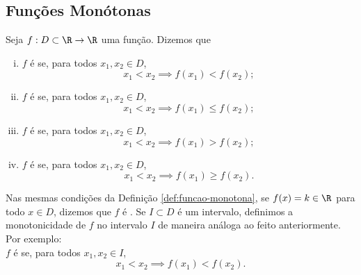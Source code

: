\subsection{Funções Monótonas}

\begin{definition}
\label{def:funcao-monotona}
    Seja $f: D \subset \R \to \R$ uma função. Dizemos que
\begin{enumerate}[(i)]
  \item $f$ é  se, para todos $x_1, x_2 \in D$,
  $$x_1 < x_2 \implies f(x_1) < f(x_2);$$
  \item $f$ é  se, para todos $x_1, x_2 \in D$,
  $$x_1 < x_2 \implies f(x_1) \leq f(x_2);$$
  \item $f$ é  se, para todos $x_1, x_2 \in D$,
  $$x_1 < x_2 \implies f(x_1) > f(x_2);$$
  \item $f$ é  se, para todos $x_1, x_2 \in D$,
  $$x_1 < x_2 \implies f(x_1) \geq f(x_2).$$
\end{enumerate}
\end{definition}

Nas mesmas condições da Definição \ref{def:funcao-monotona}, se $f(x) = k \in
\R$ para todo $x \in D$, dizemos que $f$ é .
Se $I \subset D$ é um intervalo, definimos a monotonicidade de $f$
no intervalo $I$ de maneira análoga ao feito anteriormente. Por
exemplo: \\
$f$ é  se, para todos
$x_1, x_2 \in I$,
  $$x_1 < x_2 \implies f(x_1) < f(x_2).$$